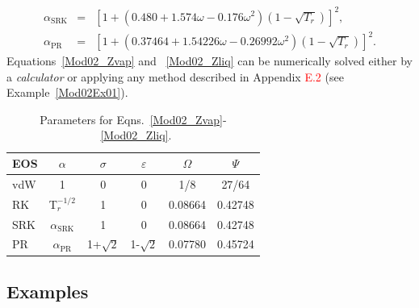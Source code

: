 \documentclass[12pts,a4paper,amsmath,amssymb,floatfix]{article}%
\newcommand{\red}{\textcolor{red}}
\begin{document}
\begin{enumerate}[i)]
\begin{enumerate}[a)]
                   \begin{eqnarray}
                         \alpha_{\text{SRK}} &=& \left[ 1 + \left( 0.480 + 1.574 \omega - 0.176\omega^{2}\right)\left(1-\sqrt{T_{r}}\right)\right]^{2}, \nonumber \\
                         \alpha_{\text{PR}} &=& \left[ 1 + \left( 0.37464 + 1.54226 \omega - 0.26992\omega^{2}\right)\left(1-\sqrt{T_{r}}\right)\right]^{2}. \nonumber
                   \end{eqnarray}
                   Equations~\ref{Mod02_Zvap} and ~\ref{Mod02_Zliq} can be numerically solved either by a {\it calculator} or applying any method described in Appendix \red{E.2} (see Example~\ref{Mod02Ex01}).

\begin{table}[h]
    \begin{center}
       \begin{tabular}{| l | c c c c c| }
       \hline
          {\bf EOS}  & {\bf $\alpha$} & {\bf $\sigma$}  & {\bf $\varepsilon$} & {\bf $\Omega$} & {\bf $\Psi$ } \\
       \hline
            vdW      & 1              & 0               & 0                  & 1/8            & 27/64          \\
            RK       & T$_{r}^{-1/2}$  & 1                & 0                  & 0.08664       & 0.42748        \\
           SRK       &$\alpha_{\text{SRK}}$& 1            & 0                   & 0.08664       & 0.42748        \\
            PR       &$\alpha_{\text{PR}}$& 1+$\sqrt{2}$   & 1-$\sqrt{2}$        & 0.07780        & 0.45724  \\
       \hline
       \end{tabular}
  \caption{Parameters for Eqns.~\ref{Mod02_Zvap}-~\ref{Mod02_Zliq}.}\label{Mod02:Table2}
  \end{center}
\end{table}

                  

%
            \end{enumerate}
% 
   \end{enumerate}

\clearpage

\subsection{Examples}
\end{document}
